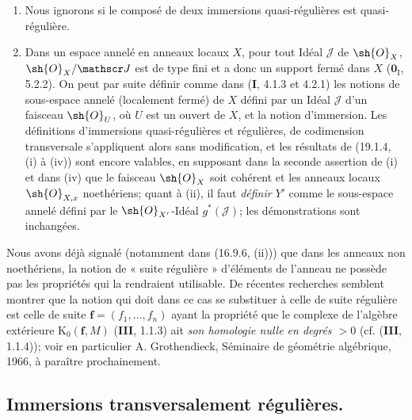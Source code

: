 \begin{remarks}[19.1.7]
\label{IV.19.1.7}
\begin{enumerate}
  \item[(i)] Nous ignorons si le composé de deux immersions quasi-régulières est quasi-régulière.
  \item[(ii)] Dans un espace annelé en anneaux locaux $X$, pour tout Idéal $\mathscr J$ de $\sh{O}_X$, $\sh{O}_X/\mathscr J$ est de type fini et a donc un support fermé dans $X$ ($\mathbf{0}_{\mathrm I}$, 5.2.2). On peut par suite définir comme dans (\textbf{I}, 4.1.3 et 4.2.1) les notions de sous-espace annelé (localement fermé) de $X$ défini par un Idéal $\mathscr J$ d'un faisceau $\sh{O}_U$, où $U$ est un ouvert de $X$, et la notion d'immersion. Les définitions d'immersions quasi-régulières et régulières, de codimension transversale s'appliquent alors sans modification, et les résultats de (19.1.4, (i) à (iv)) sont encore valables, en supposant dans la seconde assertion de (i) et dans (iv) que le faisceau $\sh{O}_X$ soit cohérent et les anneaux locaux $\sh{O}_{X,x}$ noethériens; quant à (ii), il faut \emph{définir} $Y'$ comme le sous-espace annelé défini par le $\sh{O}_{X'}$-Idéal $g^*(\mathscr J)$; les démonstrations sont inchangées.
\end{enumerate}
\end{remarks}

\begin{env}[19.1.8]
\label{IV.19.1.8}
Nous avons déjà signalé (notamment dans (16.9.6, (ii))) que dans les anneaux non noethériens, la notion de « suite régulière » d'éléments de l'anneau ne possède pas les propriétés qui la rendraient utilisable. De récentes recherches semblent montrer que la notion qui doit dans ce cas se substituer à celle de suite régulière est celle de suite $\mathbf f=(f_1,\ldots,f_n)$ ayant la propriété que le complexe de l'algèbre extérieure $\mathrm K_0(\mathbf f,M)$ (\textbf{III}, 1.1.3) ait \emph{son homologie nulle en degrés $>0$} (cf. (\textbf{III}, 1.1.4)); voir en particulier A. Grothendieck, Séminaire de géométrie algébrique, 1966, à paraître prochainement.
\end{env}


\subsection{Immersions transversalement régulières.}

